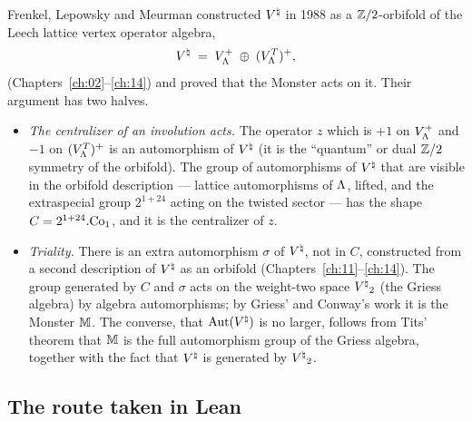 Frenkel, Lepowsky and Meurman constructed ${V^{\natural}}$ in 1988 as a ${\mathbb{Z}}/2$-orbifold of the Leech lattice vertex operator
algebra,
\begin{equation*}
  {V^{\natural}} \;=\; V_{\Lambda}^+\;\oplus\;(V_{\Lambda}^T)^+,
\end{equation*}
(Chapters~\ref{ch:02}--\ref{ch:14}) and proved that the Monster acts on it.  Their argument has two halves.
\begin{itemize}
\item \emph{The centralizer of an involution acts.}  The operator $z$ which is $+1$ on $V_{\Lambda}^+$ and $-1$ on
  $(V_{\Lambda}^T)^+$ is an automorphism of ${V^{\natural}}$ (it is the ``quantum'' or dual ${\mathbb{Z}}/2$ symmetry of the orbifold).  The
  group of automorphisms of ${V^{\natural}}$ that are visible in the orbifold description --- lattice automorphisms of
  ${\Lambda}$, lifted, and the extraspecial group $2^{1+24}$ acting on the twisted sector --- has the shape
  $C=2^{1+24}.\mathrm{Co}_1$, and it is the centralizer of $z$.
\item \emph{Triality.}  There is an extra automorphism $\sigma$ of ${V^{\natural}}$, not in $C$, constructed from a second
  description of ${V^{\natural}}$ as an orbifold (Chapters~\ref{ch:11}--\ref{ch:14}).  The group generated by $C$ and $\sigma$
  acts on the weight-two space ${V^{\natural}}_2$ (the Griess algebra) by algebra automorphisms; by Griess' and Conway's work
  it is the Monster $\mathbb{M}$.  The converse, that $\operatorname{Aut}({V^{\natural}})$ is no larger, follows from Tits' theorem that
  $\mathbb{M}$ is the full automorphism group of the Griess algebra, together with the fact that ${V^{\natural}}$ is
  generated by ${V^{\natural}}_2$.
\end{itemize}

\subsection{The route taken in Lean}

